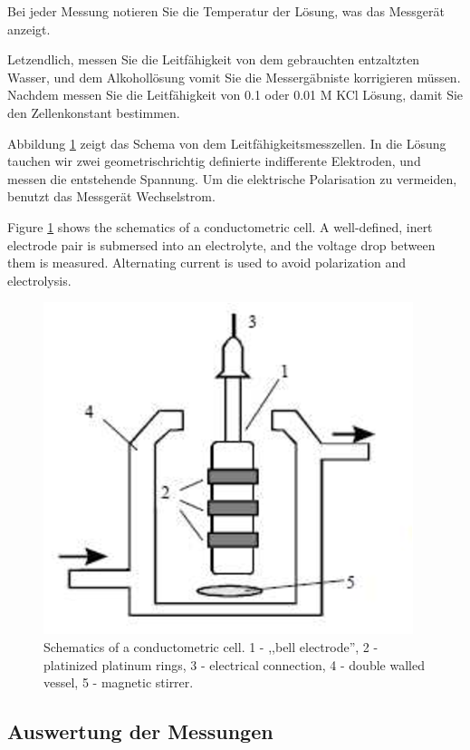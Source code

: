 Bei jeder Messung notieren Sie die Temperatur der Lösung, was das Messgerät anzeigt.

Letzendlich, messen Sie die Leitfähigkeit von dem gebrauchten entzaltzten Wasser, und dem Alkohollösung vomit Sie die Messergäbniste korrigieren müssen.
Nachdem messen Sie die Leitfähigkeit von 0.1 oder 0.01 M KCl Lösung, damit Sie den Zellenkonstant bestimmen.

Abbildung \ref{fig:vez} zeigt das Schema von dem Leitfähigkeitsmesszellen.
In die Lösung tauchen wir zwei geometrischrichtig definierte indifferente Elektroden, und messen die entstehende Spannung. 
Um die elektrische Polarisation zu vermeiden, benutzt das Messgerät Wechselstrom. 

Figure \ref{fig:vez} shows the schematics of a conductometric cell. A well-defined, inert electrode pair is submersed into an electrolyte, and the voltage drop between them is measured. Alternating current is used to avoid polarization and electrolysis.

\begin{figure}
\centering
\includegraphics{fig/cond.eps}
\caption{Schematics of a conductometric cell. 1 - ,,bell electrode'', 2 - platinized platinum rings, 3 - electrical connection, 4 - double walled vessel, 5 - magnetic stirrer.}
\label{fig:vez}
\end{figure}

\subsection{Auswertung der Messungen}


